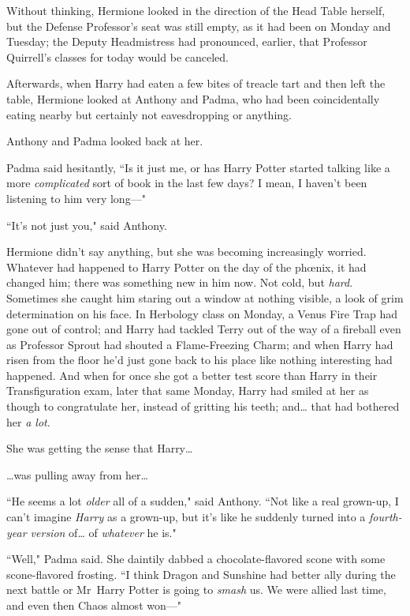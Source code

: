 Without thinking, Hermione looked in the direction of the Head Table herself, but the Defense Professor's seat was still empty, as it had been on Monday and Tuesday; the Deputy Headmistress had pronounced, earlier, that Professor Quirrell's classes for today would be canceled.

Afterwards, when Harry had eaten a few bites of treacle tart and then left the table, Hermione looked at Anthony and Padma, who had been coincidentally eating nearby but certainly not eavesdropping or anything.

Anthony and Padma looked back at her.

Padma said hesitantly, ``Is it just me, or has Harry Potter started talking like a more \emph{complicated} sort of book in the last few days? I mean, I haven't been listening to him very long—"

``It's not just you," said Anthony.

Hermione didn't say anything, but she was becoming increasingly worried. Whatever had happened to Harry Potter on the day of the phœnix, it had changed him; there was something new in him now. Not cold, but \emph{hard}. Sometimes she caught him staring out a window at nothing visible, a look of grim determination on his face. In Herbology class on Monday, a Venus Fire Trap had gone out of control; and Harry had tackled Terry out of the way of a fireball even as Professor Sprout had shouted a Flame-Freezing Charm; and when Harry had risen from the floor he'd just gone back to his place like nothing interesting had happened. And when for once she got a better test score than Harry in their Transfiguration exam, later that same Monday, Harry had smiled at her as though to congratulate her, instead of gritting his teeth; and{\ldots} that had bothered her \emph{a lot}.

She was getting the sense that Harry{\ldots}

{\ldots}was pulling away from her{\ldots}

``He seems a lot \emph{older} all of a sudden," said Anthony. ``Not like a real grown-up, I can't imagine \emph{Harry} as a grown-up, but it's like he suddenly turned into a \emph{fourth-year version} of{\ldots} of \emph{whatever} he is."

``Well," Padma said. She daintily dabbed a chocolate-flavored scone with some scone-flavored frosting. ``I think Dragon and Sunshine had better ally during the next battle or Mr~Harry Potter is going to \emph{smash} us. We were allied last time, and even then Chaos almost won—"

